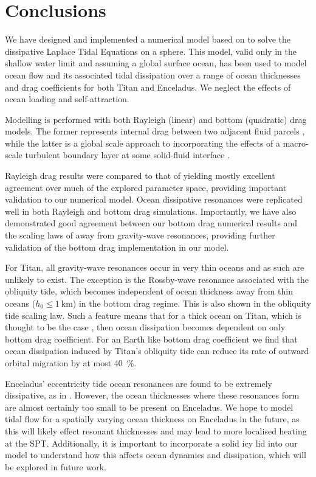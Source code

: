\section{Conclusions}

We have designed and implemented a numerical model based on \citet{sears1995tidal} to solve the dissipative Laplace Tidal Equations on a sphere. This model, valid only in the shallow water limit and assuming a global surface ocean, has been used to model ocean flow and its associated tidal dissipation over a range of ocean thicknesses and drag coefficients for both Titan and Enceladus. We neglect the effects of ocean loading and self-attraction.

Modelling is performed with both Rayleigh (linear) and bottom (quadratic) drag models. The former represents internal drag between two adjacent fluid parcels \citep{neumann1968ocean}, while the latter is a global scale approach to incorporating the effects of a macro-scale turbulent boundary layer at some solid-fluid interface \citep{gill1982atmosphere}.

Rayleigh drag results were compared to that of \citet{matsuyama2014tidal} yielding mostly excellent agreement over much of the explored parameter space, providing important validation to our numerical model. Ocean dissipative resonances were replicated well in both Rayleigh and bottom drag simulations. Importantly, we have also demonstrated good agreement between our bottom drag numerical results and the scaling laws of \citet{chen2013tidal} away from gravity-wave resonances, providing further validation of the bottom drag implementation in our model.

For Titan, all gravity-wave resonances occur in very thin oceans and as such  are unlikely to exist. The exception is the Rossby-wave resonance associated with the obliquity tide, which becomes independent of ocean thickness away from thin oceans ($h_0 \leqslant\SI{1}{\kilo\metre}$) in the bottom drag regime. This is also shown in the \citet{chen2013tidal} obliquity tide scaling law. Such a feature means that for a thick ocean on Titan, which is thought to be the case \citep{sohl2014structural}, then ocean dissipation becomes dependent on only bottom drag coefficient. For an Earth like bottom drag coefficient we find that ocean dissipation induced by Titan's obliquity tide can reduce its rate of outward orbital migration by at most \SI{40}{\percent}. 

Enceladus' eccentricity tide ocean resonances are found to be extremely dissipative, as in \citet{tyler2011tidal, matsuyama2014tidal}. However, the ocean thicknesses where these resonances form are almost certainly too small to be present on Enceladus. We hope to model tidal flow for a spatially varying ocean thickness on Enceladus in the future, as this will likely effect resonant thicknesses and may lead to more localised heating at the SPT. Additionally, it is important to incorporate a solid icy lid into our model to understand how this affects ocean dynamics and dissipation, which will be explored in future work. 